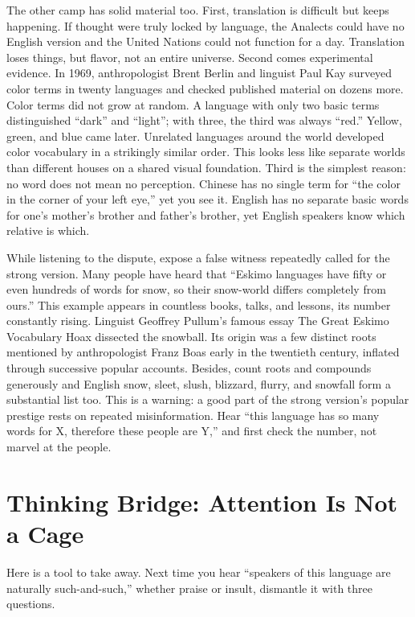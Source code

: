 The other camp has solid material too. First, translation is difficult but keeps happening. If thought were truly locked by language, the Analects could have no English version and the United Nations could not function for a day. Translation loses things, but flavor, not an entire universe. Second comes experimental evidence. In 1969, anthropologist Brent Berlin and linguist Paul Kay surveyed color terms in twenty languages and checked published material on dozens more. Color terms did not grow at random. A language with only two basic terms distinguished ``dark'' and ``light''; with three, the third was always ``red.'' Yellow, green, and blue came later. Unrelated languages around the world developed color vocabulary in a strikingly similar order. This looks less like separate worlds than different houses on a shared visual foundation. Third is the simplest reason: no word does not mean no perception. Chinese has no single term for ``the color in the corner of your left eye,'' yet you see it. English has no separate basic words for one's mother's brother and father's brother, yet English speakers know which relative is which.

While listening to the dispute, expose a false witness repeatedly called for the strong version. Many people have heard that ``Eskimo languages have fifty or even hundreds of words for snow, so their snow-world differs completely from ours.'' This example appears in countless books, talks, and lessons, its number constantly rising. Linguist Geoffrey Pullum's famous essay The Great Eskimo Vocabulary Hoax dissected the snowball. Its origin was a few distinct roots mentioned by anthropologist Franz Boas early in the twentieth century, inflated through successive popular accounts. Besides, count roots and compounds generously and English snow, sleet, slush, blizzard, flurry, and snowfall form a substantial list too. This is a warning: a good part of the strong version's popular prestige rests on repeated misinformation. Hear ``this language has so many words for X, therefore these people are Y,'' and first check the number, not marvel at the people.

\section{Thinking Bridge: Attention Is Not a Cage}
Here is a tool to take away. Next time you hear ``speakers of this language are naturally such-and-such,'' whether praise or insult, dismantle it with three questions.

